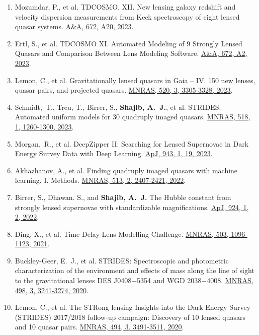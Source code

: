 \documentclass[margin, line]{res}
\begin{document}
\begin{resume}
\begin{enumerate}
	\item Mozumdar, P., et al. TDCOSMO. XII. New lensing galaxy redshift and velocity dispersion measurements from Keck spectroscopy of eight lensed quasar systems. \href{https://ui.adsabs.harvard.edu/abs/2023A\%26A...672A..20M/abstract}{A\&A, 672,  A20, 2023}.
	\item Ertl, S., et al. TDCOSMO XI. Automated Modeling of 9 Strongly Lensed Quasars and Comparison Between Lens Modeling Software. \href{https://ui.adsabs.harvard.edu/abs/2023A\%26A...672A...2E/abstract}{A\&A, 672, A2, 2023}.
	\item Lemon, C., et al. Gravitationally lensed quasars in Gaia -- IV. 150 new lenses, quasar pairs, and projected quasars. \href{https://ui.adsabs.harvard.edu/abs/2023MNRAS.520.3305L/abstract}{MNRAS, 520, 3, 3305-3328, 2023}.
	\item Schmidt,~T., Treu, T., Birrer, S., \textbf{Shajib, A.~J.}, et al. STRIDES: Automated uniform models for 30 quadruply imaged quasars. \href{https://ui.adsabs.harvard.edu/abs/2023MNRAS.518.1260S/abstract}{MNRAS, 518, 1, 1260-1300, 2023}.
	\item Morgan,~R., et al. DeepZipper II: Searching for Lensed Supernovae in Dark Energy Survey Data with Deep Learning. \href{https://ui.adsabs.harvard.edu/abs/2023ApJ...943...19M/abstract}{ApJ, 943, 1, 19, 2023}.
	\item Akhazhanov, A., et al. Finding quadruply imaged quasars with machine learning. I. Methods. \href{https://ui.adsabs.harvard.edu/abs/2022MNRAS.tmp..904A/abstract}{MNRAS, 513, 2, 2407-2421, 2022}.
	\item Birrer, S., Dhawan. S., and \textbf{Shajib, A.~J.} The Hubble constant from strongly lensed supernovae with standardizable magnifications. \href{https://iopscience.iop.org/article/10.3847/1538-4357/ac323a}{ApJ, 924, 1, 2, 2022}.
	\item Ding, X., et al. Time Delay Lens Modelling Challenge. \href{https://ui.adsabs.harvard.edu/abs/2021MNRAS.503.1096D/abstract}{MNRAS, 503, 1096-1123, 2021}.
	\item Buckley-Geer, E.~J., et al. STRIDES: Spectroscopic and photometric characterization of the environment and effects of mass along the line of sight to the gravitational lenses DES J0408$-$5354 and WGD 2038$-$4008. \href{https://ui.adsabs.harvard.edu/abs/2020MNRAS.498.3241B/abstract}{MNRAS, 498, 3, 3241-3274, 2020}.
	\item Lemon, C., et al. The STRong lensing Insights into the Dark Energy Survey (STRIDES) 2017/2018 follow-up campaign: Discovery of 10 lensed quasars and 10 quasar pairs. \href{https://doi.org/10.1093/mnras/staa652}{MNRAS, 494, 3, 3491-3511, 2020}.

\end{enumerate}
\end{resume}
\end{document}
